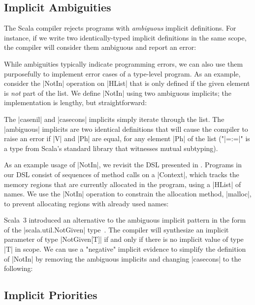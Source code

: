 \subsection{Implicit Ambiguities}
\label{subsec:implicit-ambiguities}

The Scala compiler rejects programs with \emph{ambiguous} implicit definitions.
For instance, if we write two identically-typed implicit definitions in the same scope, the compiler will consider them ambiguous and report an error:

\implicitAmbiguity

While ambiguities typically indicate programming errors, we can also use them purposefully to implement error cases of a type-level program.
As an example, consider the |NotIn| operation on |HList| that is only defined if the given element is \emph{not} part of the list.
We define |NotIn| using two ambiguous implicits; the implementation is lengthy, but straightforward:

\memImplicitNotIn

\noindent
The |casenil| and |casecons| implicits simply iterate through the list.
The |ambiguous| implicits are two identical definitions that will cause the compiler to raise an error if |V| and |Ph| are equal, for any element |Ph| of the list ("|=:=|" is a type from Scala's standard library that witnesses mutual subtyping).

As an example usage of |NotIn|, we revisit the DSL presented in .
Programs in our DSL consist of sequences of method calls on a |Context|, which tracks the memory regions that are currently allocated in the program, using a |HList| of names.
We use the |NotIn| operation to constrain the allocation method, |malloc|, to prevent allocating regions with already used names:

\memImplicitContextMalloc

Scala~3 introduced an alternative to the ambiguous implicit pattern in the form of the |scala.util.NotGiven| type~\citep[Given Instances]{odersky2013scala}.
The compiler will synthesize an implicit parameter of type |NotGiven[T]| if and only if there is no implicit value of type |T| in scope.
We can use a "negative" implicit evidence to simplify the definition of |NotIn| by removing the ambiguous implicits and changing |casecons| to the following:

\memImplicitNotGiven

\subsection{Implicit Priorities}
\label{subsec:implicit-priorities}

